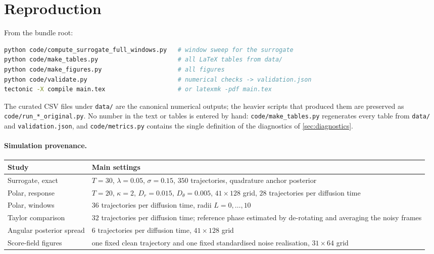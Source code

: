 \documentclass[11pt,a4paper]{article}
\begin{document}
\section{Reproduction}\label{app:repro}

From the bundle root:
\begin{lstlisting}[language=bash]
python code/compute_surrogate_full_windows.py   # window sweep for the surrogate
python code/make_tables.py                      # all LaTeX tables from data/
python code/make_figures.py                     # all figures
python code/validate.py                         # numerical checks -> validation.json
tectonic -X compile main.tex                    # or latexmk -pdf main.tex
\end{lstlisting}
The curated CSV files under \texttt{data/} are the canonical numerical outputs; the heavier
scripts that produced them are preserved as \texttt{code/run\_*\_original.py}. No number in
the text or tables is entered by hand: \texttt{code/make\_tables.py} regenerates every table
from \texttt{data/} and \texttt{validation.json}, and \texttt{code/metrics.py} contains the
single definition of the diagnostics of \cref{sec:diagnostics}.

\paragraph{Simulation provenance.}
\begin{table}[H]
\centering\small
\begin{tabularx}{\textwidth}{@{}lX@{}}
\toprule
Study & Main settings \\
\midrule
Surrogate, exact & $T=30$, $\lambda=0.05$, $\sigma=0.15$, $350$ trajectories,
  quadrature anchor posterior \\
Polar, response & $T=20$, $\kappa=2$, $D_r=0.015$, $D_\theta=0.005$, $41\times128$ grid,
  $28$ trajectories per diffusion time \\
Polar, windows & $36$ trajectories per diffusion time, radii $L=0,\ldots,10$ \\
Taylor comparison & $32$ trajectories per diffusion time; reference phase estimated by
  de-rotating and averaging the noisy frames \\
Angular posterior spread & $6$ trajectories per diffusion time, $41\times128$ grid \\
Score-field figures & one fixed clean trajectory and one fixed standardised noise realisation,
  $31\times64$ grid \\
\bottomrule
\end{tabularx}
\end{table}
\end{document}
